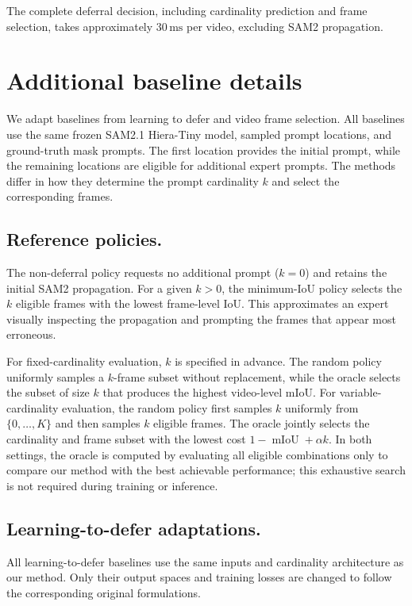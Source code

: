 The complete deferral decision, including cardinality prediction and frame selection, takes approximately \(30\,\mathrm{ms}\) per video, excluding SAM2 propagation.

\section{Additional baseline details}

We adapt baselines from learning to defer and video frame selection. All
baselines use the same frozen SAM2.1 Hiera-Tiny model, sampled prompt
locations, and ground-truth mask prompts. The first location provides the
initial prompt, while the remaining locations are eligible for additional
expert prompts. The methods differ in how they determine the prompt
cardinality \(k\) and select the corresponding frames.

\subsection{Reference policies.}
The non-deferral policy requests no additional prompt (\(k=0\)) and retains
the initial SAM2 propagation. For a given \(k>0\), the minimum-IoU policy
selects the \(k\) eligible frames with the lowest frame-level IoU. This
approximates an expert visually inspecting the propagation and prompting the
frames that appear most erroneous.

For fixed-cardinality evaluation, \(k\) is specified in advance. The random
policy uniformly samples a \(k\)-frame subset without replacement, while the
oracle selects the subset of size \(k\) that produces the highest video-level
mIoU. For variable-cardinality evaluation, the random policy first samples
\(k\) uniformly from \(\{0,\ldots,K\}\) and then samples \(k\) eligible frames.
The oracle jointly selects the cardinality and frame subset with the lowest
cost \(1-\operatorname{mIoU}+\alpha k\). In both settings, the oracle is
computed by evaluating all eligible combinations only to compare our method
with the best achievable performance; this exhaustive search is not required
during training or inference.

\subsection{Learning-to-defer adaptations.}
All learning-to-defer baselines use the same inputs and
cardinality architecture as our method.
Only their output spaces and training losses are changed to follow the
corresponding original formulations.

